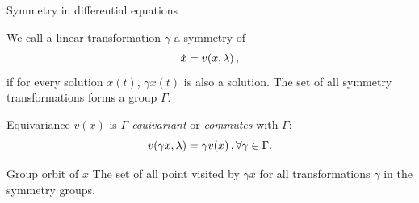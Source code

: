 \documentclass{beamer}
\begin{document}
\begin{frame}{Symmetry in differential equations}

\begin{block}{}
 We call a linear transformation $\gamma$ a symmetry of
\[
	\dot{x} = v(x,\lambda)\,,
	\label{eq:difeq} 
\]  
if for every solution $x(t)$, $\gamma x(t)$ is also a solution. The
set of all symmetry transformations forms a group $\Gamma$.
\end{block}

\begin{block}{Equivariance}
	$v(x)$ is \emph{$\Gamma$-equivariant} or \emph{commutes} with $\Gamma$:
	\[
	 v(\gamma x,\lambda)=\gamma v(x)\,, \forall \gamma\in\Gamma.
	\]
\end{block}

\begin{block}{Group orbit of $x$}
  The set of all point visited by $\gamma x$ for all transformations $\gamma$ in the symmetry groups.
\end{block}

\end{frame}

% 
\end{document}
